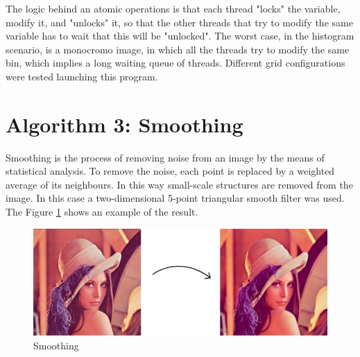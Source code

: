 \documentclass[a4paper]{article}
\begin{document}
The logic behind an atomic operations is that each thread "locks" the variable, modify it, and "unlocks" it, so that the other threads that try to modify the same variable has to wait that this will be "unlocked". The worst case, in the histogram scenario, is a monocromo image, in which all the threads try to modify the same bin, which implies a long waiting queue of threads.
 Different grid configurations were tested launching this program. 


\section{Algorithm 3: Smoothing}
\label{sec:smoo}
Smoothing is the process of removing noise from an image by the means of statistical analysis. To remove the noise, each point is replaced by a weighted average of its neighbours. In this way small-scale structures are removed from the image. In this case a two-dimensional 5-point triangular smooth filter was used. The Figure \ref{fig:smooth} shows an example of the result.

\begin{figure}[ht]
    \centering
    \includegraphics[width=0.5\linewidth]{smooth}
    \caption{Smoothing}
    \label{fig:smooth}
\end{figure}
\FloatBarrier


\printbibliography 
\end{document}
